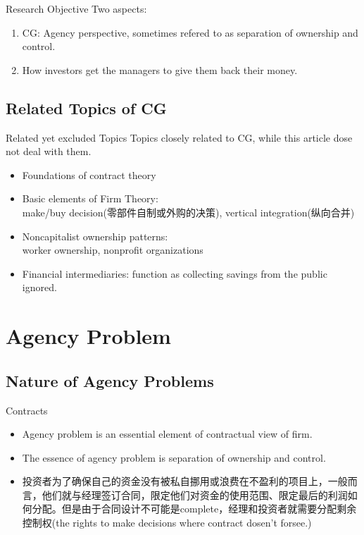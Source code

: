 	\begin{frame}{Research Objective}
		Two aspects:
		\begin{enumerate}
		\item CG: Agency perspective, sometimes refered to as separation of ownership and control.
		\item How investors get the managers to give them back their money. 
	\end{enumerate}
\end{frame}
		
\subsection{Related Topics of CG}
	\begin{frame}{Related yet excluded Topics}
	Topics closely related to CG, while this article dose not deal with them.
	\begin{itemize}
		\item Foundations of contract theory 
		\item Basic elements of Firm Theory:\\
		 make/buy decision(零部件自制或外购的决策), vertical integration(纵向合并)
		\item Noncapitalist ownership patterns: \\
		 worker ownership, nonprofit organizations
		\item Financial intermediaries: function as collecting savings from the public ignored.
	\end{itemize}
	
\end{frame}



\section{Agency Problem}
\subsection{Nature of Agency Problems}
	\begin{frame}{Contracts}
		\begin{itemize}
			\item Agency problem is an essential element of contractual view of firm.
			\item The essence of agency problem is separation of ownership and control.
			\item 投资者为了确保自己的资金没有被私自挪用或浪费在不盈利的项目上，一般而言，他们就与经理签订合同，限定他们对资金的使用范围、限定最后的利润如何分配。但是由于合同设计不可能是complete，经理和投资者就需要分配剩余控制权(the rights to make decisions where contract dosen't forsee.)
		\end{itemize}

	\end{frame}

